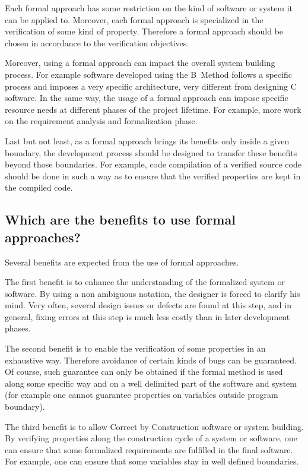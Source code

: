 Each formal approach has some restriction on the kind of software or
system it can be applied to. Moreover, each formal approach is
specialized in the verification of some kind of property. Therefore a
formal approach should be chosen in accordance to the verification
objectives.

Moreover, using a formal approach can impact the overall system building
process. For example software developed using the B~Method follows a
specific process and imposes a very specific architecture, very different
from designing C software. In the same way, the usage of a formal
approach can impose specific resource needs at different phases of the
project lifetime. For example, more work on the requirement analysis and
formalization phase.

Last but not least, as a formal approach brings its benefits only inside
a given boundary, the development process should be designed to transfer
these benefits beyond those boundaries. For example, code compilation of
a verified source code should be done in such a way as to ensure that
the verified properties are kept in the compiled code.

\subsection{Which are the benefits to use formal approaches?}

Several benefits are expected from the use of formal approaches.

The first benefit is to enhance the understanding of the formalized
system or software. By using a non ambiguous notation, the designer is
forced to clarify his mind. Very often, several design issues or defects
are found at this step, and in general, fixing errors at this step is
much less costly than in later development phases.

The second benefit is to enable the verification of some properties in
an exhaustive way. Therefore avoidance of certain kinds of bugs can be
guaranteed. Of course, such guarantee can only be obtained if the
formal method is used along some specific way and on a well delimited
part of the software and system (for example one cannot guarantee
properties on variables outside program boundary).

The third benefit is to allow Correct by Construction software or
system building. By verifying properties along the construction
cycle of a system or software, one can ensure that some formalized
requirements are fulfilled in the final software. For example, one can
ensure that some variables stay in well defined boundaries.

